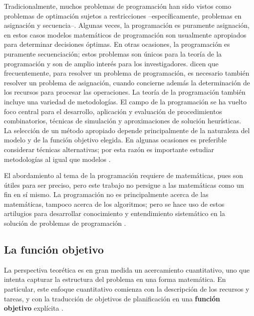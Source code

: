 \documentclass[spanish,draft,12pt,headsepline,footsepline,paper=letter]{scrreprt}
\begin{document}
Tradicionalmente, muchos problemas de programación han sido vistos como problemas de optimación sujetos a restricciones –específicamente, problemas en asignación y secuencia–. Algunas veces, la programación es puramente asignación, en estos casos modelos matemáticos de programación son usualmente apropiados para determinar decisiones óptimas. En otras ocasiones, la programación es puramente secuenciación; estos problemas son únicos para la teoría de la programación y son de amplio interés para los investigadores. \citet[p.~6]{TKindt2002} dicen que frecuentemente, para resolver un problema de programación, es necesario también resolver un problema de asignación, cuando concierne además la determinación de los recursos para procesar las operaciones. La teoría de la programación también incluye una variedad de metodologías. El campo de la programación se ha vuelto foco central para el desarrollo, aplicación y evaluación de procedimientos combinatorios, técnicas de simulación y aproximaciones de solución heurísticas. La selección de un método apropiado depende principalmente de la naturaleza del modelo y de la función objetivo elegida. En algunas ocasiones es preferible considerar técnicas alternativas; por esta razón es importante estudiar metodologías al igual que modelos \citep[p.~4,~5]{Baker2009}.

El abordamiento al tema de la programación requiere de matemáticas, pues son útiles para ser preciso, pero este trabajo no persigue a las matemáticas como un fin en sí mismo. La programación no es principalmente acerca de las matemáticas, tampoco acerca de los algoritmos; pero se hace uso de estos artilugios para desarrollar conocimiento y entendimiento sistemático en la solución de problemas de programación \citep[p.~8]{Baker2009}.

\subsection{La función objetivo}
\label{sub:funcion_objetivo}

La perspectiva teorética es en gran medida un acercamiento cuantitativo, uno que intenta capturar la estructura del problema en una forma matemática.
%
En particular, este enfoque cuantitativo comienza con la descripción de los recursos y tareas, y con la traducción de objetivos de planificación en una \textbf{función objetivo} explícita \citep[p.~3,~4]{Baker2009}.
\end{document}
